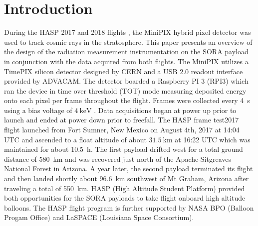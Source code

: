 \section{Introduction}
\label{Introduction}

During the HASP 2017 and 2018 flights \cite{hasp} , the MiniPIX hybrid pixel detector\cite{minipix} was used to track cosmic rays in the stratosphere. 
%
This paper presents an overview of the design of the radiation measurement  instrumentation on the SORA payload in conjunction with the data acquired  from both flights.
%
The MiniPIX utilizes a TimePIX\cite{timepix} silicon detector designed by CERN\cite{cern} and a USB 2.0 readout interface provided by ADVACAM\cite{advacam}. 
%
The detector boarded a Raspberry PI 3 (RPI3) which ran the device in time over threshold (TOT) mode measuring deposited energy onto each pixel per frame throughout the flight. 
%
Frames were collected every \SI{4}{\second} using a bias voltage of $\SI{4}{\kilo\electronvolt}$ . 
%
Data acquisitions began at power up prior to launch and ended at power down prior to freefall. 
%
The HASP frame test2017 flight launched from Fort Sumner, New Mexico on August 4th, 2017 at 14:04 UTC and ascended to a float altitude of about $\SI{31.5}{\kilo\meter}$ at 16:22 UTC which was maintained for about \SI{10.5}{\hour}.
%
 The first payload drifted west for a total ground distance of \SI{580}{\kilo\meter} and was recovered just north of the Apache-Sitgreaves National Forest in Arizona. 
 A year later, the second payload terminated its flight and then landed shortly about \SI{96.6}{\kilo\meter} southwest of Mt Graham, Arizona after traveling a total of \SI{550}{\kilo\meter}.
 HASP (High Altitude Student Platform) provided both opportunities for the SORA payloads to take flight onboard high altitude balloons. The HASP flight program is further supported by NASA BPO (Balloon Progam Office) and LaSPACE (Louisiana Space Consortium).
